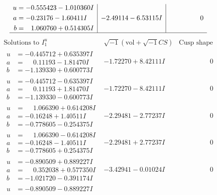 \documentclass[1p]{elsarticle_modified}
\theoremstyle{definition}
\newcommand{\I}{\sqrt{-1}}
\begin{document}
$$\begin{array}{c|c|c}
\begin{aligned}
u &= -0.555423 - 1.010360 I \\
a &= -0.23176 - 1.60411 I \\
b &= \phantom{-}1.060760 + 0.514305 I\end{aligned}
 & -2.49114 - 6.53115 I & \phantom{-0.000000 } 0\\
 \hline 
 \end{array}$$\newpage$$\begin{array}{c|c|c}  
\text{Solutions to }I^u_{1}& \I (\text{vol} + \sqrt{-1}CS) & \text{Cusp shape}\\
 \hline 
\begin{aligned}
u &= -0.445712 + 0.635397 I \\
a &= \phantom{-}0.11193 - 1.81470 I \\
b &= -1.139330 + 0.600773 I\end{aligned}
 & -1.72270 + 8.42111 I & \phantom{-0.000000 } 0 \\ \hline\begin{aligned}
u &= -0.445712 - 0.635397 I \\
a &= \phantom{-}0.11193 + 1.81470 I \\
b &= -1.139330 - 0.600773 I\end{aligned}
 & -1.72270 - 8.42111 I & \phantom{-0.000000 } 0 \\ \hline\begin{aligned}
u &= \phantom{-}1.066390 + 0.614208 I \\
a &= -0.16248 + 1.40511 I \\
b &= -0.778605 - 0.254375 I\end{aligned}
 & -2.29481 - 2.77237 I & \phantom{-0.000000 } 0 \\ \hline\begin{aligned}
u &= \phantom{-}1.066390 - 0.614208 I \\
a &= -0.16248 - 1.40511 I \\
b &= -0.778605 + 0.254375 I\end{aligned}
 & -2.29481 + 2.77237 I & \phantom{-0.000000 } 0 \\ \hline\begin{aligned}
u &= -0.890509 + 0.889227 I \\
a &= \phantom{-}0.352038 + 0.577350 I \\
b &= -1.021720 - 0.391174 I\end{aligned}
 & -3.42941 - 0.01024 I & \phantom{-0.000000 } 0 \\ \hline\begin{aligned}
u &= -0.890509 - 0.889227 I \\

\end{aligned}
\end{array}$$
\end{document}
